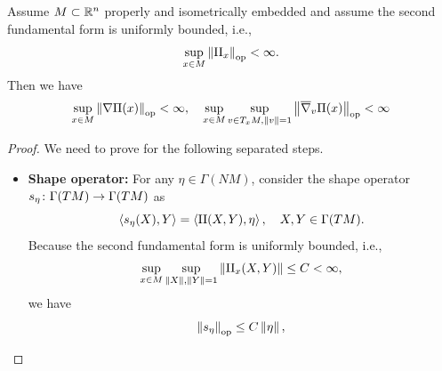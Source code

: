 \begin{lem}\label{lem:bound_secform_boun_proj}
    Assume $M \subset \mathbb{R}^n$ properly and isometrically embedded and assume the second fundamental form is uniformly bounded, i.e.,
    \begin{equation*}
        \sup_{x \in M} \left\lVert\mathrm{II}_x\right\lVert_{\operatorname{op}}< \infty.
    \end{equation*}
    Then we have
    \begin{equation*}
       \sup_{x \in M}\left\lVert\nabla \Pi(x)\right\lVert_{\operatorname{op}} < \infty ,\quad \sup_{x \in M}\sup_{v \in T_xM, \left\lVert v\right\lVert = 1}\left\lVert\overline{\nabla}_v\Pi(x)\right\lVert_{\operatorname{op}} < \infty
    \end{equation*}
\end{lem}
\begin{proof}
    We need to prove for the following separated steps.
    \begin{itemize}
        \item \textbf{Shape operator:} For any $\eta \in \Gamma(NM)$, consider the shape operator $s_\eta \colon \Gamma(TM) \rightarrow \Gamma(TM)$ as
        \begin{equation*}
            \left\langle s_\eta(X),Y \right\rangle = \left\langle \mathrm{II}(X,Y),\eta \right\rangle,\quad X,Y \in \Gamma(TM).
        \end{equation*}
        Because the second fundamental form is uniformly bounded, i.e.,
        \begin{equation*}
            \sup_{x \in M} \sup_{\left\lVert X\right\lVert,\left\lVert Y\right\lVert = 1} \left\lVert\mathrm{II}_x(X,Y)\right\lVert \leq C < \infty,
        \end{equation*}
        we have
        \begin{equation*}
            \left\lVert s_\eta\right\lVert_{\operatorname{op}} \leq C\left\lVert\eta\right\lVert,
        \end{equation*}


\end{itemize}
\end{proof}
